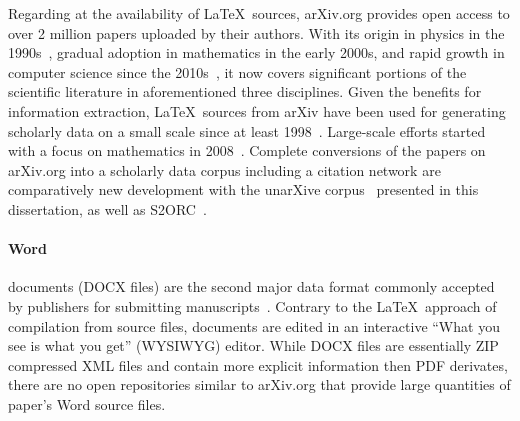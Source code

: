 Regarding at the availability of \LaTeX\ sources, arXiv.org provides open access to over 2 million papers uploaded by their authors. With its origin in physics in the 1990s~\cite{Feder2021,Ginsparg2011a}, gradual adoption in mathematics in the early 2000s, and rapid growth in computer science since the 2010s~\cite{Saier2023unarXive}, it now covers significant portions of the scientific literature in aforementioned three disciplines. Given the benefits for information extraction, \LaTeX\ sources from arXiv have been used for generating scholarly data on a small scale since at least 1998~\cite{Nanba1998}. Large-scale efforts started with a focus on mathematics in 2008~\cite{Stamerjohanns2008}. Complete conversions of the papers on arXiv.org into a scholarly data corpus including a citation network are comparatively new development with the unarXive corpus~\cite{Saier2020} presented in this dissertation, as well as S2ORC~\cite{Lo2020}.



\paragraph{Word}
documents (DOCX files) are the second major data format commonly accepted by publishers for submitting manuscripts~\cite{Johnson2018stm}. Contrary to the \LaTeX\ approach of compilation from source files, documents are edited in an interactive ``What you see is what you get'' (WYSIWYG) editor. While DOCX files are essentially ZIP compressed XML files and contain more explicit information then PDF derivates, there are no open repositories similar to arXiv.org that provide large quantities of paper's Word source files.  %

